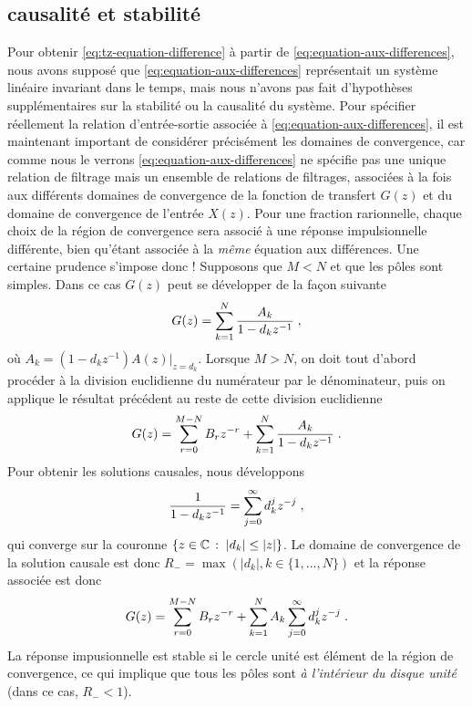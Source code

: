 \subsection{causalité et stabilité}
Pour obtenir \eqref{eq:tz-equation-difference} à partir de \eqref{eq:equation-aux-differences}, nous avons supposé que \eqref{eq:equation-aux-differences} représentait un système linéaire invariant dans le temps, mais nous n'avons pas fait d'hypothèses supplémentaires sur la stabilité ou la causalité du système. Pour spécifier réellement la relation d'entrée-sortie associée à \eqref{eq:equation-aux-differences}, il est maintenant important de considérer précisément les domaines de convergence, car comme nous le verrons \eqref{eq:equation-aux-differences} ne spécifie pas une unique relation de filtrage mais un ensemble de relations de filtrages, associées à la fois aux différents domaines de convergence de la fonction de transfert $G(z)$ et du domaine de convergence de l'entrée $X(z)$. Pour une fraction rarionnelle, chaque choix de la région de convergence sera associé à une réponse impulsionnelle différente, bien qu'étant associée à la \emph{même} équation aux différences. Une certaine prudence s'impose donc !
Supposons que $M < N$ et que les pôles sont simples. Dans ce cas $G(z)$ peut se développer de la façon suivante
\[
G(z)= \sum_{k=1}^N \frac{A_k}{1 - d_k z^{-1}} \;,
\]
où $A_k= (1-d_k z^{-1}) A(z)\vert_{z=d_k}$.  Lorsque $M > N$, on doit tout d'abord procéder à la division euclidienne du numérateur par le dénominateur, puis on applique le résultat précédent au reste de cette division euclidienne
\[
G(z)= \sum_{r=0}^{M-N} B_r z^{-r} + \sum_{k=1}^N \frac{A_k}{1-d_k z^{-1}} \;.
\]
Pour obtenir les solutions causales, nous développons
\[
\frac{1}{1-d_k z^{-1}} = \sum_{j=0}^{\infty} d_k^j z^{-j} \;,
\]
qui converge sur la couronne $\left\{z \in \mathbb{C}\,:\; |d_k| \leq |z|\right\}$. Le domaine de convergence de la solution causale est donc $R_- = \max ( |d_k|, k \in \{1,\dots,N\})$ et la réponse associée est donc
\[
G(z)= \sum_{r=0}^{M-N} B_r z^{-r} + \sum_{k=1}^N A_k \sum_{j=0}^{\infty} d_k^j z^{-j} \;.
\]
La réponse impusionnelle est stable si le cercle unité est élément de la région de convergence, ce qui implique que tous les pôles sont \emph{à l'intérieur du disque unité} (dans ce cas, $R_- < 1$).

